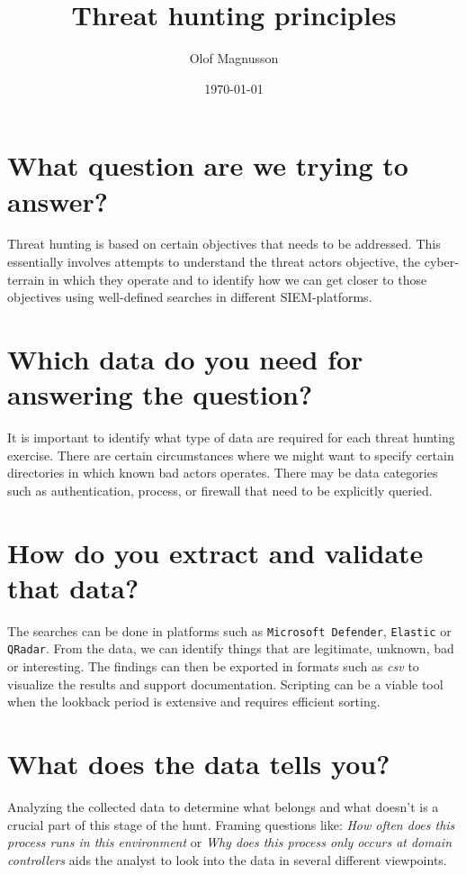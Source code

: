 \documentclass{article}
\title{Threat hunting principles \\
}
\author{Olof Magnusson}
\date{\today}
\begin{document}
	
	\maketitle
	
	\section*{What question are we trying to answer?}
Threat hunting is based on certain objectives that needs to be addressed. This essentially involves attempts to understand the threat actors objective, the cyber-terrain in which they operate and to identify how we can get closer to those objectives using well-defined searches in different SIEM-platforms. 



	\section*{Which data do you need for answering the question?}
	It is important to identify what type of data are required for each threat hunting exercise. There are certain circumstances where we might want to specify certain directories in which known bad actors operates. There may be data categories such as authentication, process, or firewall that need to be explicitly queried.
    
	\section*{How do you extract and validate that data?}
	The searches can be done in platforms such as \texttt{Microsoft Defender}, \texttt{Elastic} or \texttt{QRadar}. From the data, we can identify things that are legitimate, unknown, bad or interesting. The findings can then be exported in formats such as \textit{csv} to visualize the results and support documentation. Scripting can be a viable tool when the lookback period is extensive and requires efficient sorting.
	\section*{What does the data tells you?}
	Analyzing the collected data to determine what belongs and what doesn't is a crucial part of this stage of the hunt. Framing questions like: \textit{How often does this process runs in this environment} or \textit{Why does this process only occurs at domain controllers} aids the analyst to look into the data in several different viewpoints.
	
\end{document}
